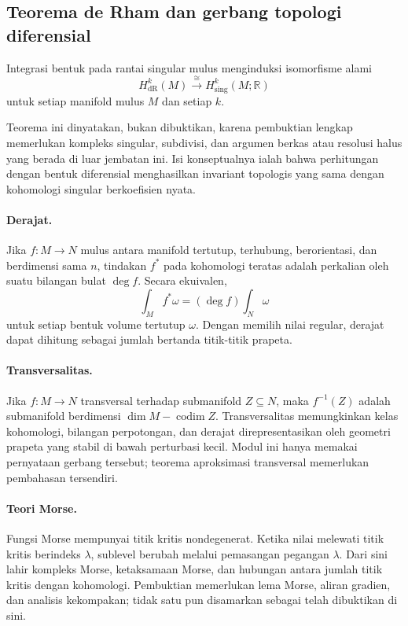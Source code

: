 \subsection{Teorema de Rham dan gerbang topologi diferensial}

\begin{Theorem}\label{o011-br-thm-de-rham}
Integrasi bentuk pada rantai singular mulus menginduksi isomorfisme alami
\[
 H^k_{\mathrm{dR}}(M)\xrightarrow{\ \cong\ }
 H^k_{\mathrm{sing}}(M;\mathbb R)
\]
untuk setiap manifold mulus $M$ dan setiap $k$.
\end{Theorem}

Teorema ini dinyatakan, bukan dibuktikan, karena pembuktian lengkap memerlukan
kompleks singular, subdivisi, dan argumen berkas atau resolusi halus yang berada
di luar jembatan ini. Isi konseptualnya ialah bahwa perhitungan dengan bentuk
diferensial menghasilkan invariant topologis yang sama dengan kohomologi
singular berkoefisien nyata.

\paragraph{Derajat.}
Jika $f\colon M\to N$ mulus antara manifold tertutup, terhubung, berorientasi,
dan berdimensi sama $n$, tindakan $f^*$ pada kohomologi teratas adalah
perkalian oleh suatu bilangan bulat $\deg f$. Secara ekuivalen,
\[
 \int_M f^*\omega=(\deg f)\int_N\omega
\]
untuk setiap bentuk volume tertutup $\omega$. Dengan memilih nilai regular,
derajat dapat dihitung sebagai jumlah bertanda titik-titik prapeta.

\paragraph{Transversalitas.}
Jika $f\colon M\to N$ transversal terhadap submanifold $Z\subseteq N$, maka
$f^{-1}(Z)$ adalah submanifold berdimensi
$\dim M-\operatorname{codim}Z$. Transversalitas memungkinkan kelas kohomologi,
bilangan perpotongan, dan derajat direpresentasikan oleh geometri prapeta yang
stabil di bawah perturbasi kecil. Modul ini hanya memakai pernyataan gerbang
tersebut; teorema aproksimasi transversal memerlukan pembahasan tersendiri.

\paragraph{Teori Morse.}
Fungsi Morse mempunyai titik kritis nondegenerat. Ketika nilai melewati titik
kritis berindeks $\lambda$, sublevel berubah melalui pemasangan pegangan
$\lambda$. Dari sini lahir kompleks Morse, ketaksamaan Morse, dan hubungan
antara jumlah titik kritis dengan kohomologi. Pembuktian memerlukan lema Morse,
aliran gradien, dan analisis kekompakan; tidak satu pun disamarkan sebagai
telah dibuktikan di sini.

